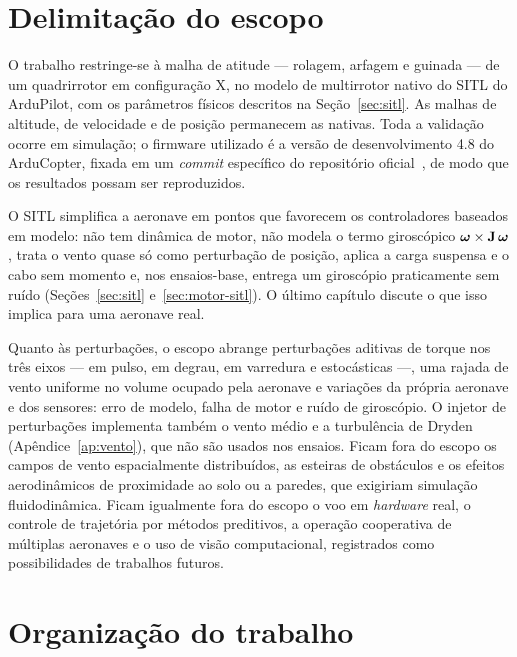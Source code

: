 \section{Delimitação do escopo}
\label{sec:delimitacao}

O trabalho restringe-se à malha de atitude --- rolagem, arfagem e guinada ---
de um quadrirrotor em configuração X, no modelo de multirrotor nativo do SITL
do ArduPilot, com os parâmetros físicos descritos na
Seção~\ref{sec:sitl}. As malhas de altitude, de velocidade e de posição
permanecem as nativas. Toda a validação ocorre em simulação; o firmware
utilizado é a versão de desenvolvimento 4.8 do ArduCopter, fixada em um
\textit{commit} específico do repositório oficial~\cite{ardupilot2026}, de modo
que os resultados possam ser reproduzidos.

O SITL simplifica a aeronave em pontos que favorecem os controladores
baseados em modelo: não tem dinâmica de motor, não modela o termo giroscópico
$\bm{\omega}\times\mathbf{J}\,\bm{\omega}$, trata o vento quase só como
perturbação de posição, aplica a carga suspensa e o cabo sem momento e, nos
ensaios-base, entrega um giroscópio praticamente sem ruído
(Seções~\ref{sec:sitl} e~\ref{sec:motor-sitl}). O último capítulo discute o
que isso implica para uma aeronave real.

Quanto às perturbações, o escopo abrange perturbações aditivas de torque nos
três eixos --- em pulso, em degrau, em varredura e estocásticas ---, uma
rajada de vento uniforme no volume ocupado pela aeronave e variações da
própria aeronave e dos sensores: erro de modelo, falha de motor e ruído de
giroscópio. O injetor de perturbações implementa também o vento médio e a
turbulência de Dryden (Apêndice~\ref{ap:vento}), que não são usados nos
ensaios. Ficam
fora do escopo os campos de vento espacialmente distribuídos, as esteiras de
obstáculos e os efeitos aerodinâmicos de proximidade ao solo ou a paredes, que
exigiriam simulação fluidodinâmica. Ficam igualmente fora do escopo o voo em
\textit{hardware} real, o controle de trajetória por métodos preditivos, a
operação cooperativa de múltiplas aeronaves e o uso de visão computacional,
registrados como possibilidades de trabalhos futuros.

\section{Organização do trabalho}
\label{sec:organizacao}

